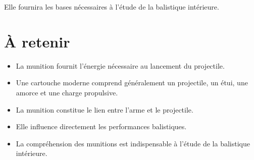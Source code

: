 Elle fournira les bases nécessaires à l'étude de la balistique intérieure.

\section{À retenir}

\begin{aretenir}

\begin{itemize}
    \item La munition fournit l'énergie nécessaire au lancement du
          projectile.
    \item Une cartouche moderne comprend généralement un projectile, un
          étui, une amorce et une charge propulsive.
    \item La munition constitue le lien entre l'arme et le projectile.
    \item Elle influence directement les performances balistiques.
    \item La compréhension des munitions est indispensable à l'étude de la
          balistique intérieure.
\end{itemize}

\end{aretenir}

